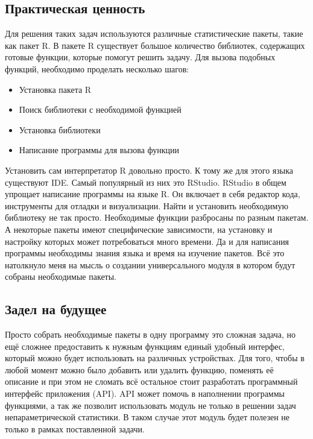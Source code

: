 \documentclass[14pt,a4paper]{scrartcl}
\begin{document}
    \subsection[Практическая ценность]{Практическая ценность}
    Для решения таких задач используются различные статистические пакеты, такие как пакет R.
    В пакете R существует большое количество библиотек, содержащих готовые функции, которые помогут решить задачу.
    Для вызова подобных функций, необходимо проделать несколько шагов:

    \begin{itemize}[noitemsep]
        \item Установка пакета R
        \item Поиск библиотеки с необходимой функцией
        \item Установка библиотеки
        \item Написание программы для вызова функции
    \end{itemize}

    Установить сам интерпретатор R довольно просто.
    К тому же для этого языка существуют IDE.
    Самый популярный из них это RStudio.
    RStudio в общем упрощает написание программы на языке R.
    Он включает в себя редактор кода, инструменты для отладки и визуализации.
    Найти и установить необходимую библиотеку не так просто.
    Необходимые функции разбросаны по разным пакетам.
    А некоторые пакеты имеют специфические зависимости, на установку и настройку которых может потребоваться много времени.
    Да и для написания программы необходимы знания языка и время на изучение пакетов.
    Всё это натолкнуло меня на мысль о создании универсального модуля в котором будут собраны необходимые пакеты.

    \subsection[Задел на будущее]{Задел на будущее}
    Просто собрать необходимые пакеты в одну программу это сложная задача, но ещё сложнее предоставить к нужным функциям единый удобный интерфес, который можно будет использовать на различных устройствах.
    Для того, чтобы в любой момент можно было добавить или удалить функцию, поменять её описание и при этом не сломать всё остальное стоит разработать программный интерфейс приложения (API).
    API может помочь в наполнении программы функциями, а так же позволит использовать модуль не только в решении задач непараметрической статистики.
    В таком случае этот модуль будет полезен не только в рамках поставленной задачи.
\end{document}
